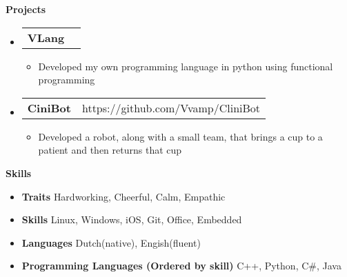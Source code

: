 \documentclass[letterpaper,12pt]{article}[leftmargin=*]
\makeatletter
\def \entryspacing {-0pt}
\renewcommand{\section}[2]{\vspace{5pt}
  \colorbox{secondary}{\color{white}\raggedbottom\normalsize\textbf{{#1}{\hspace{7pt}#2}}}
}
\newcommand{\resumeEntryStart}{\begin{itemize}[leftmargin=2.5mm]}
\newcommand{\resumeEntryEnd}{\end{itemize}\vspace{\entryspacing}}
\newcommand{\resumeItemListStart}{\begin{itemize}[leftmargin=4.5mm]}
\newcommand{\resumeItemListEnd}{\end{itemize}}
\newcommand{\resumeItem}[1]{
  \item\small{
    {#1 \vspace{-2pt}}
  }
}
\newcommand{\resumeEntryTD}[2]{
  \vspace{-1pt}\item[]
    \begin{tabularx}{0.97\textwidth}{X@{\hspace{60pt}}r}
      \textbf{\color{primary}#1} & {\firabook\color{accent}\small#2} \\
    \end{tabularx}\vspace{-6pt}
}
\newcommand{\resumeEntryS}[2]{
  \item[]\small{
    \textbf{\color{primary}#1 }{ #2 \vspace{-6pt}}
  }
}
\makeatother
\begin{document}
  


\section{\faFlask}{Projects}

  \resumeEntryStart
    \resumeEntryTD
      {VLang}{}
    \resumeItemListStart
      \resumeItem {Developed my own programming language in python using functional programming}
    \resumeItemListEnd
  \resumeEntryEnd

  \resumeEntryStart
    \resumeEntryTD
      {CiniBot}{https://github.com/Vvamp/CliniBot}
    \resumeItemListStart
      \resumeItem {Developed a robot, along with a small team, that brings a cup to a patient and then returns that cup}
    \resumeItemListEnd
  \resumeEntryEnd
  

 

\section{\faGears}{Skills}
 \resumeEntryStart
  \resumeEntryS{Traits } {Hardworking, Cheerful, Calm, Empathic}
  \resumeEntryS{Skills } {Linux, Windows, iOS, Git, Office, Embedded}
  \resumeEntryS{Languages } {Dutch(native), Engish(fluent)}
  \resumeEntryS{Programming Languages (Ordered by skill)} {C++, Python, C\#, Java}

 \resumeEntryEnd
\end{document}
